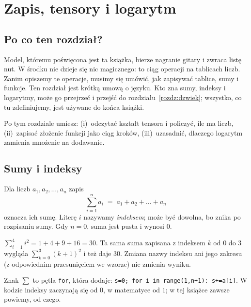 \chapter{Zapis, tensory i logarytm}\label{rozdz:zapis}

\section{Po co ten rozdział?}

Model, któremu poświęcona jest ta książka, bierze nagranie gitary i zwraca listę nut. W środku
nie dzieje się nic magicznego: to ciąg operacji na tablicach liczb. Zanim opiszemy te operacje,
musimy się umówić, jak zapisywać tablice, sumy i funkcje. Ten rozdział jest krótką umową
o języku. Kto zna sumy, indeksy i logarytmy, może go przejrzeć i przejść do rozdziału~\ref{rozdz:dzwiek};
wszystko, co tu zdefiniujemy, jest używane do końca książki.

Po tym rozdziale umiesz: (i)~odczytać kształt tensora i policzyć, ile ma liczb, (ii)~zapisać
złożenie funkcji jako ciąg kroków, (iii)~uzasadnić, dlaczego logarytm zamienia mnożenie na dodawanie.

\section{Sumy i indeksy}

\begin{definicja}[Suma]\label{def:suma}
Dla liczb $a_1,a_2,\dots,a_n$ zapis
\begin{equation}
  \sum_{i=1}^{n} a_i \;=\; a_1+a_2+\dots+a_n
\end{equation}
oznacza ich sumę. Literę $i$ nazywamy \emph{indeksem}; może być dowolna, bo znika po rozpisaniu sumy.
Gdy $n=0$, suma jest pusta i wynosi $0$.
\end{definicja}

\begin{przyklad}\label{prz:suma}
$\sum_{i=1}^{4} i^2 = 1+4+9+16 = 30$. Ta sama suma zapisana z indeksem $k$ od $0$ do $3$ wygląda
$\sum_{k=0}^{3}(k+1)^2$ i też daje $30$. Zmiana nazwy indeksu ani jego zakresu (z odpowiednim
przesunięciem we wzorze) nie zmienia wyniku.
\end{przyklad}

\begin{intuicja}
Znak $\sum$ to pętla \texttt{for}, która dodaje: \texttt{s=0; for i in range(1,n+1): s+=a[i]}.
W kodzie indeksy zaczynają się od $0$, w matematyce od $1$; w tej książce zawsze powiemy, od czego.
\end{intuicja}

